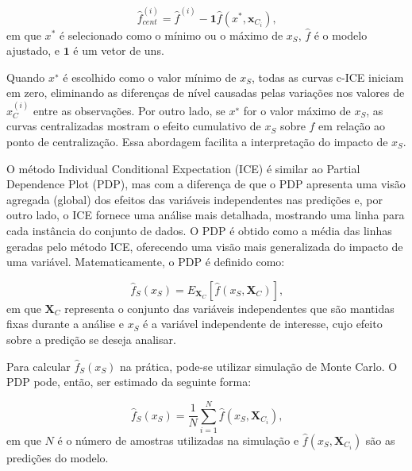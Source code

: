 \documentclass[
  12pt,
  a4paper,
]{scrreprt}
\begin{document}
\[
\hat{f}_{cent}^{\left(i\right)} = \hat{f}^{\left(i\right)} - \mathbf{1} \hat{f}\left(x^*, \mathbf x_{C_i}\right)\text{,}
\] em que \(x^*\) é selecionado como o mínimo ou o máximo de
\(x_S\)\hspace{0pt}, \(\hat f\)\hspace{0pt} é o modelo ajustado, e
\(\mathbf 1\) é um vetor de uns.

\vspace{12pt}

Quando \(x^∗\) é escolhido como o valor mínimo de \(x_S\), todas as
curvas c-ICE iniciam em zero, eliminando as diferenças de nível causadas
pelas variações nos valores de \(x_C^{\left(i\right)}\)\hspace{0pt}
entre as observações. Por outro lado, se \(x^∗\) for o valor máximo de
\(x_S\), as curvas centralizadas mostram o efeito cumulativo de
\(x_S\)\hspace{0pt} sobre \(\hat f\)\hspace{0pt} em relação ao ponto de
centralização. Essa abordagem facilita a interpretação do impacto de
\(x_S\).

\vspace{12pt}

O método Individual Conditional Expectation (ICE) é similar ao Partial
Dependence Plot (PDP), mas com a diferença de que o PDP apresenta uma
visão agregada (global) dos efeitos das variáveis independentes nas
predições e, por outro lado, o ICE fornece uma análise mais detalhada,
mostrando uma linha para cada instância do conjunto de dados. O PDP é
obtido como a média das linhas geradas pelo método ICE, oferecendo uma
visão mais generalizada do impacto de uma variável. Matematicamente, o
PDP é definido como:

\[
\hat{f}_{S}\left(x_{S}\right) = E_{\mathbf{X}_{C}}\left[\hat{f}\left(x_{S}, \mathbf{X}_{C}\right)\right]\text{,}
\] em que \(\mathbf{X}_C\) representa o conjunto das variáveis
independentes que são mantidas fixas durante a análise e \(x_S\) é a
variável independente de interesse, cujo efeito sobre a predição se
deseja analisar.

\vspace{12pt}

Para calcular \(\hat{f}_S\left(x_S\right)\) na prática, pode-se utilizar
simulação de Monte Carlo. O PDP pode, então, ser estimado da seguinte
forma:

\[
\hat{f}_S\left(x_S\right) = \frac{1}{N} \sum^{N}_{i=1}\hat{f}\left(x_{S}, \mathbf{X}_{C_i}\right)\text{,}
\] em que \(N\) é o número de amostras utilizadas na simulação e
\(\hat{f}\left(x_{S}, \mathbf{X}_{C_i}\right)\) são as predições do
modelo.
\end{document}
